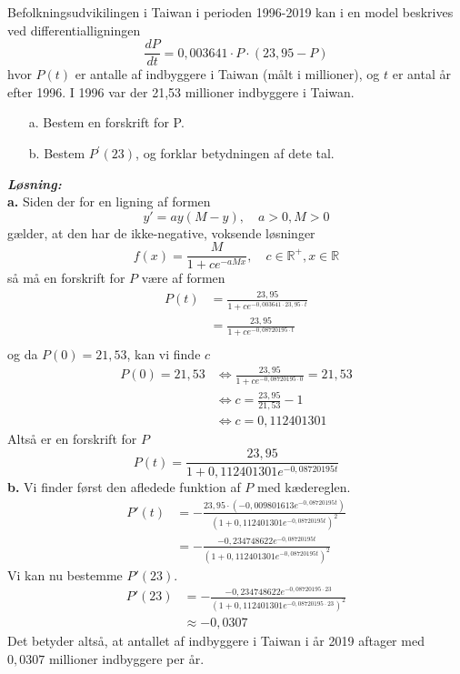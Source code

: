\documentclass{article}
\newcommand{\sol}{\setlength{\parindent}{0cm}\textbf{\textit{Løsning:}}\setlength{\parindent}{1cm}}
\begin{document}
\begin{question}{}{}
  Befolkningsudvikilingen i Taiwan i perioden 1996-2019 kan i en model beskrives ved differentialligningen
  \[
\frac{dP}{dt}=0,003641\cdot P\cdot(23,95-P)
  \] 
hvor $P(t)$ er antalle af indbyggere i Taiwan (målt i millioner), og $t$ er antal år efter 1996.
I 1996 var der 21,53 millioner indbyggere i Taiwan.
\begin{itemize}
  \item[a.] Bestem en forskrift for P.
  \item[b.] Bestem $P^{\prime}(23)$, og forklar betydningen af dete tal.
\end{itemize}
\end{question}
\sol \\
\textbf{a.}
Siden der for en ligning af formen
\[
y'=ay(M-y), \quad a>0, M>0
\] 
gælder, at den har de ikke-negative, voksende løsninger 
\[
f(x)= \frac{M}{1+c e^{-aMx} }, \quad c \in \mathbb{R}^+, x \in \mathbb{R}
\] 
så må en forskrift for $P$ være af formen 
\begin{equation*}
\begin{split}
  P(t)&=\frac{23,95}{1+c e^{-0,003641 \cdot 23,95 \cdot t} }\\
  &=\frac{23,95}{1+c e^{-0,08720195\cdot t} }\\
\end{split}
\end{equation*}
og da $P(0)=21,53$, kan vi finde $c$
\begin{equation*}
\begin{split}
  P(0)=21,53 &\iff \frac{23,95}{1+c e^{-0,08720195\cdot 0} } =21,53\\
  &\iff c=\frac{23,95}{21,53}-1\\
  &\iff c=0,112401301
\end{split}
\end{equation*}
Altså er en forskrift for $P$
\[
P(t)=\frac{23,95}{1+0,112401301 e^{-0,08720195t} }
\] 
\textbf{b.}
Vi finder først den afledede funktion af $P$ med kædereglen. 
\begin{equation*}
\begin{split}
  P'(t)&=-\frac{23,95 \cdot \left(-0,009801613 e^{-0,08720195 t} \right) }{\left( 1+0,112401301 e^{-0,08720195t} \right)^2}\\
  &=-\frac{-0,234748622 e^{-0,08720195t } }{\left( 1+0,112401301 e^{-0,08720195t} \right)^2}
\end{split}
\end{equation*}
Vi kan nu bestemme $P'(23)$.
\begin{equation*}
\begin{split}
  P'(23)&=-\frac{-0,234748622 e^{-0,08720195 \cdot 23} }{\left( 1+0,112401301 e^{-0,08720195 \cdot 23} \right)^2}\\
  &\approx -0,0307
\end{split}
\end{equation*}
Det betyder altså, at antallet af indbyggere i Taiwan i år 2019 aftager med $0,0307$ millioner indbyggere per år. 
\end{document}
